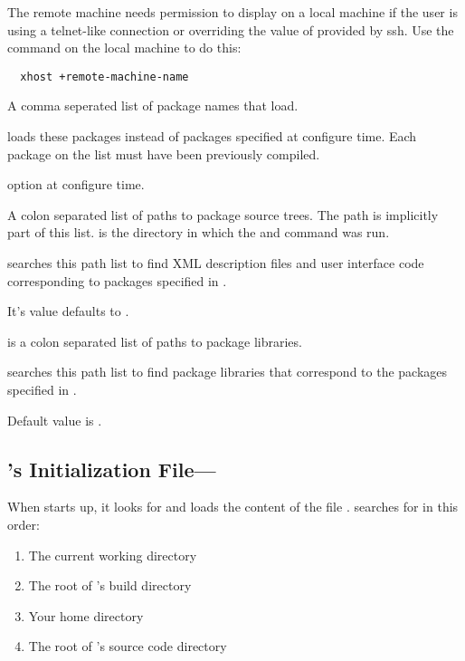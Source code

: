 \begin{description}
  The remote machine needs permission to display on
  a local machine if the user is using a telnet-like connection or overriding the value of    provided by ssh.
  Use the  command on the local machine to do
  this:

\begin{verbatim}
  xhost +remote-machine-name
\end{verbatim}
  
   A comma seperated list of package names that
  \sr{} load.
  
\sr{} loads these packages instead of packages specified at configure time. Each package on the list must have been previously compiled.
  
   option at configure time.
  
   A colon separated list of paths to
  package source trees.  The path
   is implicitly part of this
  list.   is the directory in which the
   and  command was run.
  
  \sr{} searches this path list to find XML description files and
  user interface code corresponding to packages
  specified in .
  
  It's value defaults to .
  
    is a colon
  separated list of paths to package libraries.
  
  \sr{} searches this path list to find package libraries
  that correspond to the packages specified in
  .
  
  Default value is .

  
\end{description}

\subsection{\sr{}'s Initialization File---}
\label{sec:scirunrc}

When \sr{} starts up, it looks for and
loads the content of the file .  \sr{} searches for
 in this order:

\begin{enumerate}
\item The current working directory
\item The root of \sr's build directory
\item Your home directory
\item The root of \sr's source code directory
\end{enumerate}

